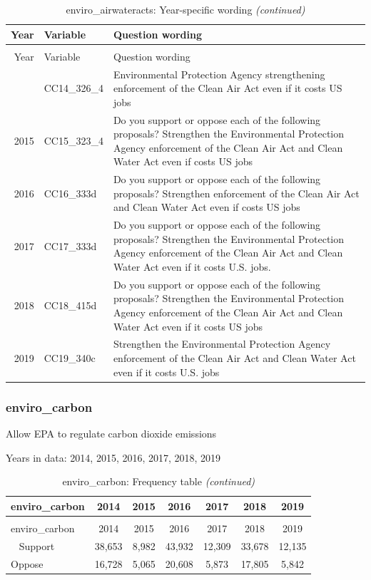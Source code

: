 \documentclass[12pt]{article}
\begin{document}
\begin{longtable}[t]{rl>{\raggedright\arraybackslash}p{10cm}}
\caption{\label{tab:unnamed-chunk-4}enviro\_airwateracts: Year-specific wording}\\
\toprule
Year & Variable & Question wording\\
\midrule
\endfirsthead
\caption[]{enviro\_airwateracts: Year-specific wording \textit{(continued)}}\\
\toprule
Year & Variable & Question wording\\
\midrule
\endhead
\
\endfoot
\bottomrule
\endlastfoot
2014 & CC14\_326\_4 & Environmental Protection Agency strengthening enforcement of the Clean Air Act even if it costs US jobs\\
2015 & CC15\_323\_4 & Do you support or oppose each of the following proposals? Strengthen the Environmental Protection Agency enforcement of the Clean Air Act and Clean Water Act even if costs US jobs\\
2016 & CC16\_333d & Do you support or oppose each of the following proposals? Strengthen enforcement of the Clean Air Act and Clean Water Act even if costs US jobs\\
2017 & CC17\_333d & Do you support or oppose each of the following proposals? Strengthen the Environmental Protection Agency enforcement of the Clean Air Act and Clean Water Act even if it costs U.S. jobs.\\
2018 & CC18\_415d & Do you support or oppose each of the following proposals? Strengthen the Environmental Protection Agency enforcement of the Clean Air Act and Clean Water Act even if it costs US jobs\\
2019 & CC19\_340c & Strengthen the Environmental Protection Agency enforcement of the Clean Air Act and Clean Water Act even if it costs U.S. jobs\\*
\end{longtable}

\subsubsection{enviro\_carbon}\label{enviro_carbon}

Allow EPA to regulate carbon dioxide emissions

Years in data: 2014, 2015, 2016, 2017, 2018, 2019

\begin{longtable}[t]{lcccccc}
\caption{\label{tab:unnamed-chunk-4}enviro\_carbon: Frequency table}\\
\toprule
enviro\_carbon & 2014 & 2015 & 2016 & 2017 & 2018 & 2019\\
\midrule
\endfirsthead
\caption[]{enviro\_carbon: Frequency table \textit{(continued)}}\\
\toprule
enviro\_carbon & 2014 & 2015 & 2016 & 2017 & 2018 & 2019\\
\midrule
\endhead
\
\endfoot
\bottomrule
\endlastfoot
Support & 38,653 & 8,982 & 43,932 & 12,309 & 33,678 & 12,135\\
Oppose & 16,728 & 5,065 & 20,608 & 5,873 & 17,805 & 5,842\\*
\end{longtable}
\end{document}
